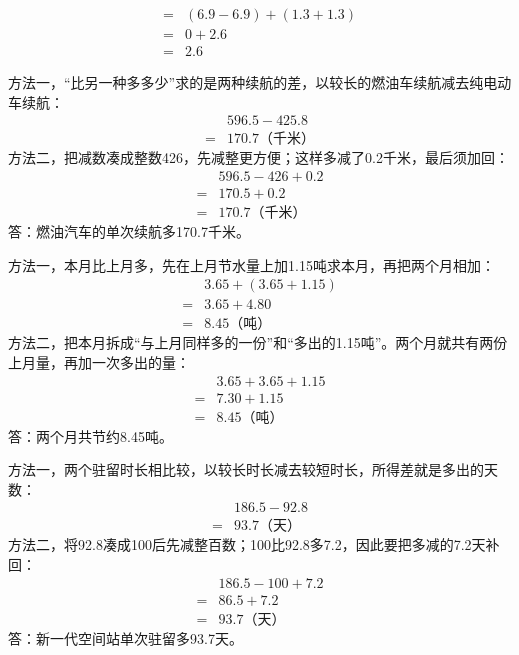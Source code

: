 \documentclass[multi=snippet,border=0pt]{standalone}
\newenvironment{snippet}[3]{\begin{minipage}{#1bp}\color{answerred}\fontsize{#2}{#3}\selectfont\raggedright}{\end{minipage}}
\begin{document}
\begin{snippet}{232.0}{10.5}{12.8}\[\begin{aligned}={}&(6.9-6.9)+(1.3+1.3)\\={}&0+2.6\\={}&2.6\end{aligned}\]\end{snippet}
\begin{snippet}{505}{11.5}{14}方法一，“比另一种多多少”求的是两种续航的差，以较长的燃油车续航减去纯电动车续航：\[\begin{aligned}&596.5-425.8\\={}&170.7\text{（千米）}\end{aligned}\]方法二，把减数凑成整数426，先减整更方便；这样多减了0.2千米，最后须加回：\[\begin{aligned}&596.5-426+0.2\\={}&170.5+0.2\\={}&170.7\text{（千米）}\end{aligned}\]答：燃油汽车的单次续航多170.7千米。\end{snippet}
\begin{snippet}{505}{11.5}{14}方法一，本月比上月多，先在上月节水量上加1.15吨求本月，再把两个月相加：\[\begin{aligned}&3.65+(3.65+1.15)\\={}&3.65+4.80\\={}&8.45\text{（吨）}\end{aligned}\]方法二，把本月拆成“与上月同样多的一份”和“多出的1.15吨”。两个月就共有两份上月量，再加一次多出的量：\[\begin{aligned}&3.65+3.65+1.15\\={}&7.30+1.15\\={}&8.45\text{（吨）}\end{aligned}\]答：两个月共节约8.45吨。\end{snippet}
\begin{snippet}{505}{11.5}{14}方法一，两个驻留时长相比较，以较长时长减去较短时长，所得差就是多出的天数：\[\begin{aligned}&186.5-92.8\\={}&93.7\text{（天）}\end{aligned}\]方法二，将92.8凑成100后先减整百数；100比92.8多7.2，因此要把多减的7.2天补回：\[\begin{aligned}&186.5-100+7.2\\={}&86.5+7.2\\={}&93.7\text{（天）}\end{aligned}\]答：新一代空间站单次驻留多93.7天。\end{snippet}
\end{document}
